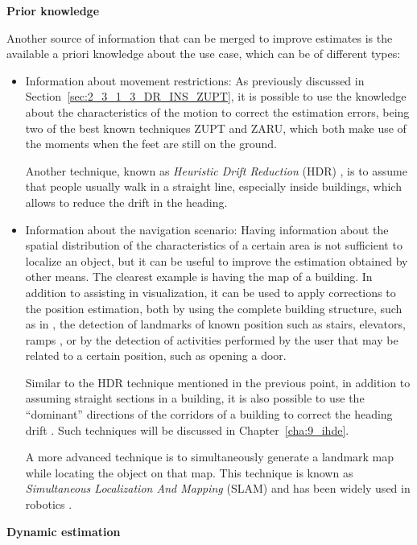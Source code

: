 \begin{description}
	\item \textbf{Prior knowledge}
		
	Another source of information that can be merged to improve estimates is the available a priori knowledge about the use case, which can be of different types:	
	\begin{itemize}
		\item Information about movement restrictions:
				As previously discussed in Section~\ref{sec:2_3_1_3_DR_INS_ZUPT}, it is possible to use the knowledge about the characteristics of the motion to correct the estimation errors, being two of the best known techniques ZUPT and ZARU, which both make use of the moments when the feet are still on the ground.
				
				Another technique, known as \emph{Heuristic Drift Reduction} (HDR) \cite{borenstein_heuristic_2009}, is to assume that people usually walk in a straight line, especially inside buildings, which allows to reduce the drift in the heading.				
		\item Information about the navigation scenario:
				Having information about the spatial distribution of the characteristics of a certain area is not sufficient to localize an object, but it can be useful to improve the estimation obtained by other means.
				The clearest example is having the map of a building. In addition to assisting in visualization, it can be used to apply corrections to the position estimation, both by using the complete building structure, such as in \cite{woodman_pedestrian_2008, xiao_lightweight_2014, bataineh_conditional_2016}, the detection of landmarks of known position such as stairs, elevators, ramps \cite{jimenez_pdr_2011}, or by the detection of activities performed by the user that may be related to a certain position, such as opening a door.
				
				Similar to the HDR technique mentioned in the previous point, in addition to assuming straight sections in a building, it is also possible to use the ``dominant'' directions of the corridors of a building to correct the heading drift \cite{borenstein_heuristic_2010, abdulrahim_aiding_2010, jimenez_improved_2011, jimenez_improved_2012}. 
				Such techniques will be discussed in Chapter~\ref{cha:9_ihde}.
				
				A more advanced technique is to simultaneously generate a landmark map while locating the object on that map. 
				This technique is known as \emph{Simultaneous Localization And Mapping} (SLAM) and has been widely used in robotics \cite{durrant-whyte_simultaneous_2006}.				
	\end{itemize}	
	\item \textbf{Dynamic estimation}	
	

\end{description}
